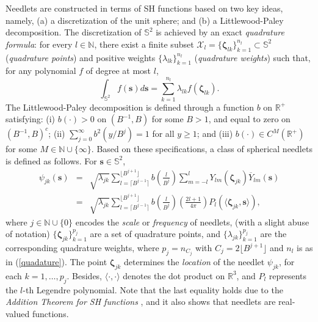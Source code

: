 \documentclass[aoas,preprint]{imsart}
\numberwithin{equation}{section}
\theoremstyle{plain}
\begin{document}
Needlets are constructed in terms of SH functions based on two key ideas,
namely, (a) a discretization of the unit sphere; and (b) a Littlewood-Paley decomposition. The discretization of $\mathbb{S}^2$ is achieved by an exact \textit{quadrature formula}: for every $l\in \mathbb{N}$, there exist a finite subset 
$\mathcal{X}_l=\{ \bm{\zeta}_{lk} \}_{k=1}^{n_l}\subset \mathbb{S}^2$ (\textit{quadrature points}) and positive weights $\{ \lambda_{lk}\}_{k=1}^{n_l} $ (\textit{quadrature weights}) such that, for any polynomial $f$ of degree at most $l$,
\begin{equation}\label{quadature}
\int_{\mathbb{S}^2} f(\mathbf{s})d\mathbf{s} = \sum \limits_{k=1}^{n_l} \lambda_{lk} f(\bm{\zeta}_{lk}).
\end{equation}
The Littlewood-Paley decomposition is defined through a function $b$ on
$\mathbb{R}^+$ satisfying:
(i) $b(\cdot) > 0$ on $(B^{-1},B)$ for some $B > 1$, and equal to zero on $(B^{-1},B)^c$; (ii)
$\sum_{j=0}^\infty b^2(y/B^j) = 1$ for all $y \geq 1$; and (iii) $b(\cdot) \in C^M(\mathbb{R}^+)$ for some $M \in \mathbb{N} \cup \{\infty\}$.
Based on these specifications, a class of spherical needlets is defined as follows. For $\mathbf{s} \in \mathbb{S}^2$, 
\begin{eqnarray}\label{needlet}
\psi_{jk}(\mathbf{s}) & = & \sqrt{\lambda_{jk}} \sum \limits_{l=\lceil B^{j-1} \rceil}^{\lfloor B^{j+1} \rfloor} b\left( \frac{l}{B^j} \right) \sum \limits_{m=-l}^{l} Y_{lm}(\bm{\zeta}_{jk})\overline{Y}_{lm}(\mathbf{s}) \nonumber \\
& = & \sqrt{\lambda_{jk}} \sum \limits_{l=\lceil B^{j-1} \rceil}^{\lfloor B^{j+1} \rfloor} b\left( \frac{l}{B^j} \right) \left( \frac{2l+1}{4\pi} \right) P_l(\langle \bm{\zeta}_{jk}, \mathbf{s} \rangle),
\end{eqnarray}
where $j\in \mathbb{N}\cup\{ 0\}$ encodes the \textit{scale} or \textit{frequency} of needlets, (with a slight abuse of 
notation) $\{\bm{\zeta}_{jk}\}_{k=1}^{p_j}$ are a set of quadrature points, and $\{\lambda_{jk}\}_{k=1}^{p_j}$ are the 
corresponding quadrature weights, where $p_j = n_{C_j}$ with $C_j = 2 \lfloor B^{j+1}\rfloor$
and $n_l$ is as in (\ref{quadature}). The point $\bm{\zeta}_{jk}$ determines the \textit{location} of the 
needlet $\psi_{jk}$, for each $k=1,\ldots,p_j$. Besides, $\langle \cdot, \cdot \rangle$ denotes the dot product on $\mathbb{R}^3$, and $P_l$ represents the $l$-th Legendre polynomial. Note that the last equality holds due to the \textit{Addition Theorem for SH functions} \citep[Theorem 2.9]{Atkinson-12}, and it also shows that needlets are real-valued functions.
\end{document}
